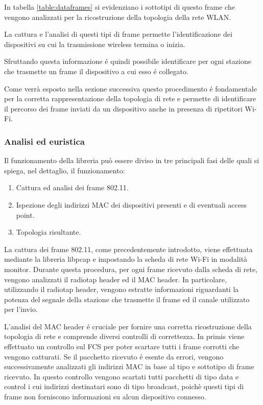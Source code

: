 In tabella \ref{table:dataframes} si evidenziano i sottotipi di questo frame che vengono analizzati per la ricostruzione della topologia della rete WLAN.

La cattura e l'analisi di questi tipi di frame permette l'identificazione dei dispositivi su cui la trasmissione wireless termina o inizia.

Sfruttando questa informazione \'e quindi possibile identificare per ogni stazione che trasmette un frame il dispositivo a cui esso \'e collegato.

Come verr\`a esposto nella sezione successiva questo procedimento \'e fondamentale per la corretta rappresentazione della topologia di rete e permette di identificare il percorso dei frame inviati da un dispositivo anche in presenza di ripetitori Wi-Fi.

\subsubsection{Analisi ed euristica}

Il funzionamento della libreria pu\`o essere diviso in tre principali fasi delle quali si  spiega, nel dettaglio, il funzionamento:

\begin{enumerate}
	\item Cattura ed analisi dei frame 802.11.
	\item Ispezione degli indirizzi MAC dei dispositivi presenti e di eventuali access point. 
	\item Topologia risultante.
\end{enumerate}

La cattura dei frame 802.11, come precedentemente introdotto, viene effettuata mediante la libreria libpcap e impostando la scheda di rete Wi-Fi in modalit\`a monitor.
Durante questa procedura, per ogni frame ricevuto dalla scheda di rete, vengono analizzati il radiotap header ed il MAC header.
In particolare, utilizzando il radiotap header, vengono estratte informazioni riguardanti la potenza del segnale della stazione che trasmette il frame ed il canale utilizzato per l'invio.

L'analisi del MAC header \'e cruciale per fornire una corretta ricostruzione della topologia di rete e comprende diversi controlli di correttezza.
In primis viene effettuato un controllo sul FCS per poter scartare tutti i frame corrotti che vengono catturati.
Se il pacchetto ricevuto \'e esente da errori, vengono successivamente analizzati gli indirizzi MAC in base al tipo e sottotipo di frame ricevuto.
In questo controllo vengono scartati tutti pacchetti di tipo data e control i cui indirizzi destinatari sono di tipo broadcast, poich\`e questi tipi di frame non forniscono informazioni su alcun dispositivo connesso.

